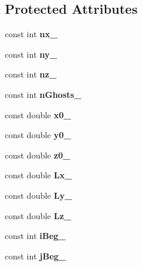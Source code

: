 \subsection*{Protected Attributes}
\begin{DoxyCompactItemize}
\item 
\hypertarget{class_grid_af1915aaf156bbc0677d2f8853643fddb}{}\label{class_grid_af1915aaf156bbc0677d2f8853643fddb} 
const int {\bfseries nx\+\_\+}
\item 
\hypertarget{class_grid_a017c2ce200149e3f6b9e1feec7432be3}{}\label{class_grid_a017c2ce200149e3f6b9e1feec7432be3} 
const int {\bfseries ny\+\_\+}
\item 
\hypertarget{class_grid_af66fb5b609dbae6a5c47db6a3726a109}{}\label{class_grid_af66fb5b609dbae6a5c47db6a3726a109} 
const int {\bfseries nz\+\_\+}
\item 
\hypertarget{class_grid_a98debafd3794f12c96db014d5a81eaba}{}\label{class_grid_a98debafd3794f12c96db014d5a81eaba} 
const int {\bfseries n\+Ghosts\+\_\+}
\item 
\hypertarget{class_grid_aace2e7b11d2a22c87ea16b532e6c20a4}{}\label{class_grid_aace2e7b11d2a22c87ea16b532e6c20a4} 
const double {\bfseries x0\+\_\+}
\item 
\hypertarget{class_grid_a68796bd5f9418d0777516b19871a77bd}{}\label{class_grid_a68796bd5f9418d0777516b19871a77bd} 
const double {\bfseries y0\+\_\+}
\item 
\hypertarget{class_grid_a6532d09f92dfa370d11e302a6a3eff9a}{}\label{class_grid_a6532d09f92dfa370d11e302a6a3eff9a} 
const double {\bfseries z0\+\_\+}
\item 
\hypertarget{class_grid_a2ee01f81fd767620cfcae164be951713}{}\label{class_grid_a2ee01f81fd767620cfcae164be951713} 
const double {\bfseries Lx\+\_\+}
\item 
\hypertarget{class_grid_a7cd0a2a18b5f0d063984da365de2d893}{}\label{class_grid_a7cd0a2a18b5f0d063984da365de2d893} 
const double {\bfseries Ly\+\_\+}
\item 
\hypertarget{class_grid_afb8df0a51563cb751ccd94cc29b69e7a}{}\label{class_grid_afb8df0a51563cb751ccd94cc29b69e7a} 
const double {\bfseries Lz\+\_\+}
\item 
\hypertarget{class_grid_a168dc221b038fa0130606ddba9281534}{}\label{class_grid_a168dc221b038fa0130606ddba9281534} 
const int {\bfseries i\+Beg\+\_\+}
\item 
\hypertarget{class_grid_ac7599170601ea6b6d1a7d6c4b671b24c}{}\label{class_grid_ac7599170601ea6b6d1a7d6c4b671b24c} 
const int {\bfseries j\+Beg\+\_\+}
\item 

\end{DoxyCompactItemize}
